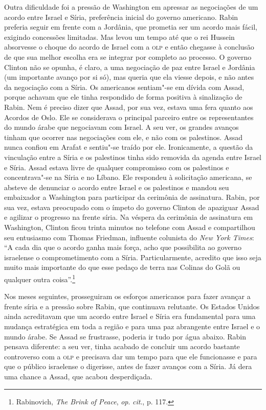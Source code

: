 Outra dificuldade foi a pressão de Washington em apressar as negociações de
um acordo entre Israel e Síria, preferência inicial do governo
americano. Rabin preferia seguir em frente com a Jordânia, que prometia
ser um acordo mais fácil, exigindo concessões limitadas. Mas levou um
tempo até que o rei Hussein absorvesse o choque do acordo de Israel com
a \textsc{olp} e então chegasse à conclusão de que sua melhor escolha era se
integrar por completo ao processo. O governo Clinton não se opunha, é
claro, a uma negociação de paz entre Israel e Jordânia (um importante
avanço por si só), mas queria que ela viesse depois, e não antes da
negociação com a Síria. Os americanos sentiam"-se em dívida com Assad,
porque achavam que ele tinha respondido de forma positiva à sinalização
de Rabin. Nem é preciso dizer que Assad, por sua vez, estava uma fera
quanto aos Acordos de Oslo. Ele se considerava o principal parceiro
entre os representantes do mundo árabe que negociavam com Israel. A seu
ver, os grandes avanços tinham que ocorrer nas negociações com ele, e
não com os palestinos. Assad nunca confiou em Arafat e sentiu"-se traído
por ele. Ironicamente, a questão da vinculação entre a Síria e os
palestinos tinha sido removida da agenda entre Israel e Síria. Assad
estava livre de qualquer compromisso com os palestinos e concentrava"-se
na Síria e no Líbano. Ele respondeu à solicitação americana, se absteve
de denunciar o acordo entre Israel e os palestinos e mandou seu
embaixador a Washington para participar da cerimônia de assinatura.
Rabin, por sua vez, estava preocupado com o ímpeto do governo Clinton de
apaziguar Assad e agilizar o progresso na frente síria. Na véspera da
cerimônia de assinatura em Washington, Clinton ficou trinta minutos no
telefone com Assad e compartilhou seu entusiasmo com Thomas Friedman,
influente colunista do \emph{New York Times}: ``A cada dia que o acordo
ganha mais força, acho que possibilita ao governo israelense o
comprometimento com a Síria. Particularmente, acredito que isso seja
muito mais importante do que esse pedaço de terra nas Colinas do Golã ou
qualquer outra coisa''.\footnote{Rabinovich, \emph{The Brink of Peace},
  \emph{op}. \emph{cit}., p. 117.}

Nos meses seguintes, prosseguiram os esforços americanos para fazer
avançar a frente síria e a pressão sobre Rabin, que continuava
relutante. Os Estados Unidos ainda acreditavam que um acordo entre
Israel e Síria era fundamental para uma mudança estratégica em toda a
região e para uma paz abrangente entre Israel e o mundo árabe. Se Assad
se frustrasse, poderia ir tudo por água abaixo. Rabin pensava diferente:
a seu ver, tinha acabado de concluir um acordo bastante controverso com
a \textsc{olp} e precisava dar um tempo para que ele funcionasse e para que o
público israelense o digerisse, antes de fazer avanços com a Síria. Já
dera uma chance a Assad, que acabou desperdiçada.


